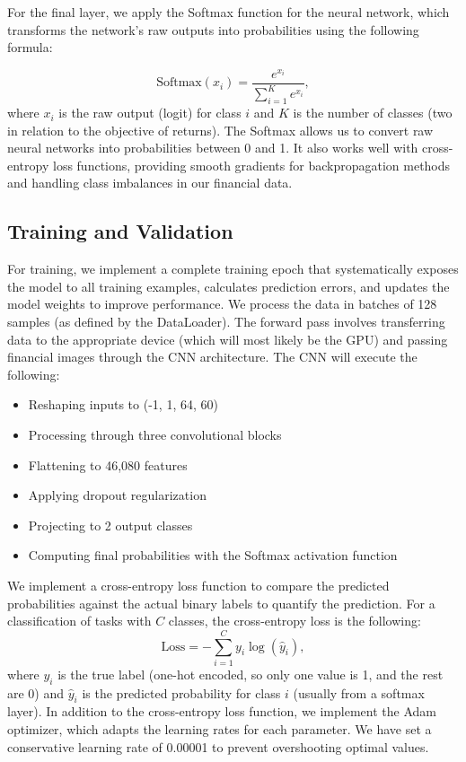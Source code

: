 \documentclass[12pt]{article}
\begin{document}
For the final layer, we apply the Softmax function for the neural network, which transforms the network's raw outputs into probabilities using the following formula:

\begin{equation}
	\text{Softmax}(x_i)=\frac{e^{x_i}}{\sum_{i=1}^K e^{x_i}},
\end{equation}
where $x_i$ is the raw output (logit) for class $i$ and $K$ is the number of classes (two in relation to the objective of returns). The Softmax allows us to convert raw neural networks into probabilities between 0 and 1. It also works well with cross-entropy loss functions, providing smooth gradients for backpropagation methods and handling class imbalances in our financial data.

\subsection*{Training and Validation}

For training, we implement a complete training epoch that systematically exposes the model to all training examples, calculates prediction errors, and updates the model weights to improve performance. We process the data in batches of 128 samples (as defined by the DataLoader). The forward pass involves transferring data to the appropriate device (which will most likely be the GPU) and passing financial images through the CNN architecture. The CNN will execute the following:

\begin{itemize}
	\item Reshaping inputs to (-1, 1, 64, 60)
	\item Processing through three convolutional blocks
	\item Flattening to 46,080 features
	\item Applying dropout regularization
	\item Projecting to 2 output classes
	\item Computing final probabilities with the Softmax activation function
\end{itemize}
We implement a cross-entropy loss function to compare the predicted probabilities against the actual binary labels to quantify the prediction. For a classification of tasks with $C$ classes, the cross-entropy loss is the following:
\begin{equation}
	\text{Loss}=-\sum_{i=1}^{C}y_i\log\left(\hat{y}_i\right),
\end{equation}
where $y_i$ is the true label (one-hot encoded, so only one value is 1, and the rest are 0) and $\hat{y}_i$ is the predicted probability for class $i$ (usually from a softmax layer). In addition to the cross-entropy loss function, we implement the Adam optimizer, which adapts the learning rates for each parameter. We have set a conservative learning rate of 0.00001 to prevent overshooting optimal values.
\end{document}
